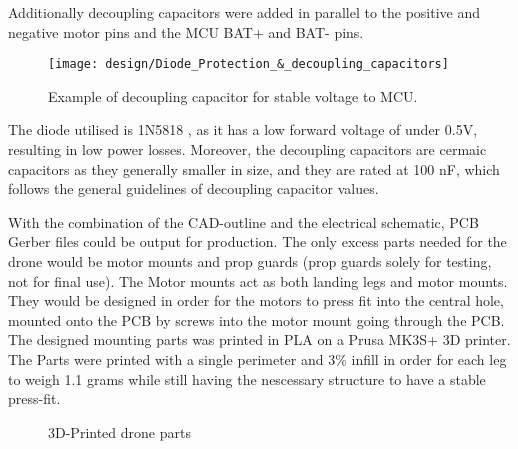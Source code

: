 Additionally decoupling capacitors were added in 
parallel to the positive and negative motor pins 
and the MCU BAT+ and BAT- pins.

\begin{figure}[H]
    \begin{center}
    \texttt{[image: design/Diode\_Protection\_\&\_decoupling\_capacitors]}
    \end{center}
    \caption{Example of decoupling capacitor for stable voltage to MCU.}
    \label{fig:Diode_Protection_&_decoupling_capacitors}
\end{figure}

The diode utilised is 1N5818 \cite{1N5818}, as it has a low 
forward voltage of under 0.5V, resulting in low 
power losses. Moreover, the decoupling capacitors
are cermaic capacitors as they generally smaller
in size, and they are rated at 100 nF, which follows 
the general guidelines of decoupling capacitor values.
\cite{DecouplingCap}

With the combination of the CAD-outline and the electrical schematic, PCB Gerber files could be output for production. The only excess parts needed for the drone would be motor mounts and prop guards (prop guards solely for testing, not for final use). The Motor mounts act as both landing legs and motor mounts. They would be designed in order for the motors to press fit into the central hole, mounted onto the PCB by screws into the motor mount going through the PCB. The designed mounting parts was printed in PLA on a Prusa MK3S+ 3D printer. The Parts were printed with a single perimeter and 3\% infill in order for each leg to weigh 1.1 grams while still having the nescessary structure to have a stable press-fit. 

\begin{figure}[H]%
    \centering
    \qquad
    \qquad
    \caption{3D-Printed drone parts}%
    \label{fig:example}%
\end{figure}

